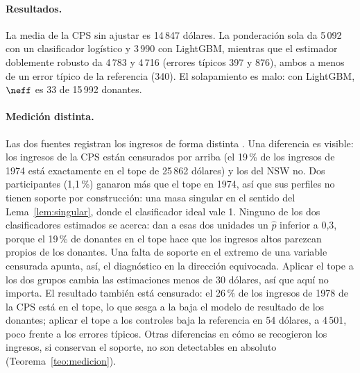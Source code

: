 \paragraph{Resultados.} La media de la CPS sin ajustar es 14\,847 dólares. La ponderación sola da 5\,092 con un clasificador logístico y 3\,990 con LightGBM, mientras que el estimador doblemente robusto da 4\,783 y 4\,716 (errores típicos 397 y 876), ambos a menos de un error típico de la referencia (340). El solapamiento es malo: con LightGBM, $\neff$ es 33 de 15\,992 donantes.

\paragraph{Medición distinta.} Las dos fuentes registran los ingresos de forma distinta \citep{smith2005}. Una diferencia es visible: los ingresos de la CPS están censurados por arriba (el 19\,\% de los ingresos de 1974 está exactamente en el tope de 25\,862 dólares) y los del NSW no. Dos participantes (1,1\,\%) ganaron más que el tope en 1974, así que sus perfiles no tienen soporte por construcción: una masa singular en el sentido del Lema~\ref{lem:singular}, donde el clasificador ideal vale 1. Ninguno de los dos clasificadores estimados se acerca: dan a esas dos unidades un $\hat p$ inferior a 0,3, porque el 19\,\% de donantes en el tope hace que los ingresos altos parezcan propios de los donantes. Una falta de soporte en el extremo de una variable censurada apunta, así, el diagnóstico en la dirección equivocada. Aplicar el tope a los dos grupos cambia las estimaciones menos de 30 dólares, así que aquí no importa. El resultado también está censurado: el 26\,\% de los ingresos de 1978 de la CPS está en el tope, lo que sesga a la baja el modelo de resultado de los donantes; aplicar el tope a los controles baja la referencia en 54 dólares, a 4\,501, poco frente a los errores típicos. Otras diferencias en cómo se recogieron los ingresos, si conservan el soporte, no son detectables en absoluto (Teorema~\ref{teo:medicion}).
